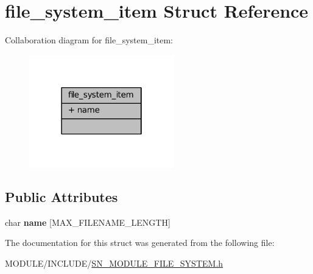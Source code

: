 \hypertarget{structfile__system__item}{}\section{file\+\_\+system\+\_\+item Struct Reference}
\label{structfile__system__item}


Collaboration diagram for file\+\_\+system\+\_\+item\+:\nopagebreak
\begin{figure}[H]
\begin{center}
\leavevmode
\includegraphics[width=178pt]{structfile__system__item__coll__graph}
\end{center}
\end{figure}
\subsection*{Public Attributes}
\begin{DoxyCompactItemize}
\item 
\mbox{\label{structfile__system__item_af2cb1b1e0020f20a6b89c9521a24a931}} 
char {\bfseries name} \mbox{[}M\+A\+X\+\_\+\+F\+I\+L\+E\+N\+A\+M\+E\+\_\+\+L\+E\+N\+G\+TH\mbox{]}
\end{DoxyCompactItemize}


The documentation for this struct was generated from the following file\+:\begin{DoxyCompactItemize}
\item 
M\+O\+D\+U\+L\+E/\+I\+N\+C\+L\+U\+D\+E/\hyperlink{SN__MODULE__FILE__SYSTEM_8h}{S\+N\+\_\+\+M\+O\+D\+U\+L\+E\+\_\+\+F\+I\+L\+E\+\_\+\+S\+Y\+S\+T\+E\+M.\+h}\end{DoxyCompactItemize}
